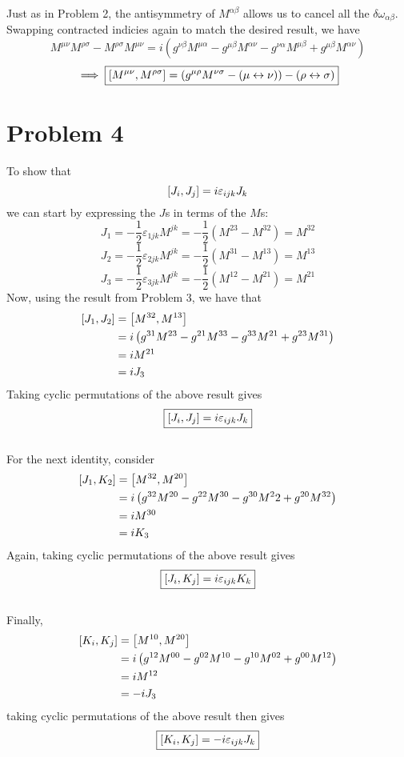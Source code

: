 \documentclass[12pt]{article}
\begin{document}
Just as in Problem 2, the antisymmetry of $M^{\alpha\beta}$ allows us to cancel all the $\delta\omega_{\alpha\beta}$. Swapping contracted indicies again to match the desired result, we have
\[ M^{\mu\nu}M^{\rho\sigma} - M^{\rho\sigma}M^{\mu\nu} = i\left(g^{\nu\beta}M^{\mu\alpha} - g^{\mu\beta}M^{\alpha\nu} - g^{\nu\alpha}M^{\mu\beta} + g^{\mu\beta}M^{\alpha\nu} \right) \]
\[ \implies \boxed{\comm{M^{\mu\nu}}{M^{\rho\sigma}} = \left(g^{\mu\rho}M^{\nu\sigma} - (\mu \leftrightarrow \nu)\right) - (\rho \leftrightarrow \sigma)} \]


\section*{Problem 4}
To show that
\[ \comm{J_i}{J_j} = i\varepsilon_{ijk}J_k \]
we can start by expressing the $J$s in terms of the $M$s:
\[ J_1 = -\frac{1}{2}\varepsilon_{1jk}M^{jk} = -\frac{1}{2}\left(M^{23} - M^{32}\right) = M^{32} \]
\[ J_2 = -\frac{1}{2}\varepsilon_{2jk}M^{jk} = -\frac{1}{2}\left(M^{31} - M^{13}\right) = M^{13} \]
\[ J_3 = -\frac{1}{2}\varepsilon_{3jk}M^{jk} = -\frac{1}{2}\left(M^{12} - M^{21}\right) = M^{21} \]
Now, using the result from Problem 3, we have that
\begin{align*}
    \comm{J_1}{J_2} &= \comm{M^{32}}{M^{13}} \\
    &= i\left(g^{31}M^{23} - g^{21}M^{33} - g^{33}M^{21} + g^{23}M^{31}\right) \\
    &= iM^{21} \\
    &= iJ_3
\end{align*}
Taking cyclic permutations of the above result gives
\[ \boxed{\comm{J_i}{J_j} = i\varepsilon_{ijk}J_k} \]
\\
For the next identity, consider
\begin{align*}
    \comm{J_1}{K_2} &= \comm{M^{32}}{M^{20}} \\
    &= i\left(g^{32}M^{20} - g^{22}M^{30} - g^{30}M^22 + g^{20}M^{32}\right) \\
    &= iM^{30} \\
    &= iK_3
\end{align*}
Again, taking cyclic permutations of the above result gives
\[ \boxed{\comm{J_i}{K_j} = i\varepsilon_{ijk}K_k} \]
\\
Finally,
\begin{align*}
    \comm{K_i}{K_j} &= \comm{M^{10}}{M^{20}} \\
    &= i\left(g^{12}M^{00} - g^{02}M^{10} - g^{10}M^{02} + g^{00}M^{12}\right) \\
    &= iM^{12} \\
    &= -iJ_3
\end{align*}
taking cyclic permutations of the above result then gives
\[ \boxed{\comm{K_i}{K_j} = -i\varepsilon_{ijk}J_k} \]
\end{document}
